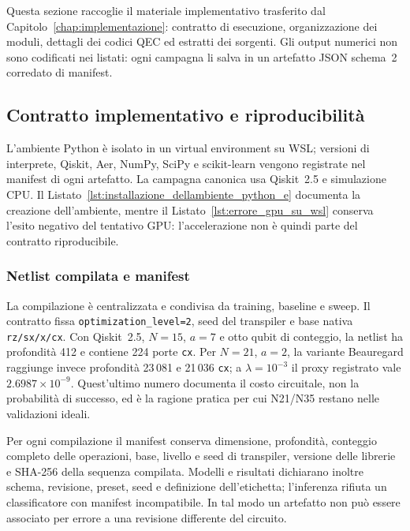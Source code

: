
\begin{onehalfspace}

Questa sezione raccoglie il materiale implementativo trasferito dal
Capitolo~\ref{chap:implementazione}: contratto di esecuzione, organizzazione dei moduli,
dettagli dei codici QEC ed estratti dei sorgenti. Gli output numerici non sono codificati
nei listati: ogni campagna li salva in un artefatto JSON schema~2 corredato di manifest.

\subsection{Contratto implementativo e riproducibilità}
\label{app:contratto_codice}

L'ambiente Python è isolato in un virtual environment su \ac{WSL}; versioni di
interprete, Qiskit, Aer, NumPy, SciPy e scikit-learn vengono registrate nel manifest di
ogni artefatto. La campagna canonica usa Qiskit~2.5 e simulazione \ac{CPU}. Il
Listato~\ref{lst:installazione_dellambiente_python_e} documenta la creazione
dell'ambiente, mentre il Listato~\ref{lst:errore_gpu_su_wsl} conserva l'esito negativo
del tentativo GPU: l'accelerazione non è quindi parte del contratto riproducibile.

\subsubsection{Netlist compilata e manifest}
\label{app:netlist_manifest}

La compilazione è centralizzata e condivisa da training, baseline e sweep. Il contratto
fissa \texttt{optimization\_level=2}, seed del transpiler e base nativa
\texttt{rz/sx/x/cx}. Con Qiskit~2.5, $N=15$, $a=7$ e otto qubit di conteggio, la
netlist ha profondità 412 e contiene 224 porte \texttt{cx}. Per $N=21$, $a=2$, la
variante Beauregard raggiunge invece profondità 23\,081 e 21\,036 \texttt{cx}; a
$\lambda=10^{-3}$ il proxy registrato vale $2.6987\times10^{-9}$. Quest'ultimo numero
documenta il costo circuitale, non la probabilità di successo, ed è la ragione pratica
per cui N21/N35 restano nelle validazioni ideali.

Per ogni compilazione il manifest conserva dimensione, profondità, conteggio completo
delle operazioni, base, livello e seed di transpiler, versione delle librerie e SHA-256
della sequenza compilata. Modelli e risultati dichiarano inoltre schema, revisione,
preset, seed e definizione dell'etichetta; l'inferenza rifiuta un classificatore con
manifest incompatibile. In tal modo un artefatto non può essere associato per errore a
una revisione differente del circuito.


\end{onehalfspace}
